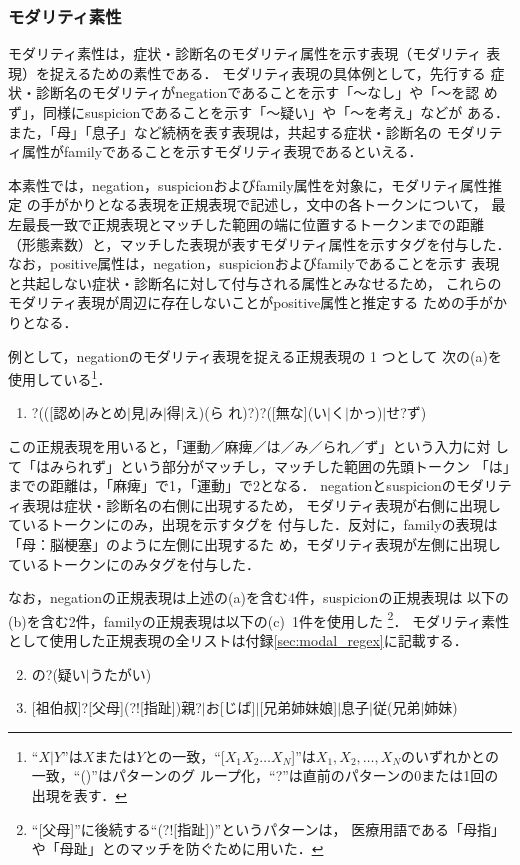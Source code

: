 \documentclass[japanese]{jnlp_1.4}
\begin{document}
\subsubsection*{モダリティ素性}

モダリティ素性は，症状・診断名のモダリティ属性を示す表現（モダリティ
表現）を捉えるための素性である．
モダリティ表現の具体例として，先行する
症状・診断名のモダリティがnegationであることを示す「〜なし」や「〜を認
めず」，同様にsuspicionであることを示す「〜疑い」や「〜を考え」などが
ある．また，「母」「息子」など続柄を表す表現は，共起する症状・診断名の
モダリティ属性がfamilyであることを示すモダリティ表現であるといえる．

本素性では，negation，suspicionおよびfamily属性を対象に，モダリティ属性推定
の手がかりとなる表現を正規表現で記述し，文中の各トークンについて，
最左最長一致で正規表現とマッチした範囲の端に位置するトークンまでの距離
（形態素数）と，マッチした表現が表すモダリティ属性を示すタグを付与した．
なお，positive属性は，negation，suspicionおよびfamilyであることを示す
表現と共起しない症状・診断名に対して付与される属性とみなせるため，
これらのモダリティ表現が周辺に存在しないことがpositive属性と推定する
ための手がかりとなる．

例として，negationのモダリティ表現を捉える正規表現の 1 つとして
次の(a)を
使用している\footnote{``$X|Y$''は$X$または$Y$との一致，``[$X_1 X_2 \dots
  X_N$]''は$X_1,X_2,\dots,X_N$のいずれかとの一致，``()''はパターンのグ
  ループ化，``?''は直前のパターンの0または1回の出現を表す．}．
\renewcommand{\labelenumi}{}
\begin{enumerate}
 \item \![はがを]?(([認め$|$みとめ$|$見$|$み$|$得$|$え)(ら
  れ)?)?([無な](い$|$く$|$かっ)$|$せ?ず)
\end{enumerate}
この正規表現を用いると，「運動／麻痺／は／み／られ／ず」という入力に対
して「はみられず」という部分がマッチし，マッチした範囲の先頭トークン
「は」までの距離は，「麻痺」で1，「運動」で2となる．
negationとsuspicionのモダリティ表現は症状・診断名の右側に出現するため，
モダリティ表現が右側に出現しているトークンにのみ，出現を示すタグを
付与した．反対に，familyの表現は「母：脳梗塞」のように左側に出現するた
め，モダリティ表現が左側に出現しているトークンにのみタグを付与した．

なお，negationの正規表現は上述の(a)を含む4件，suspicionの正規表現は
以下の(b)を含む2件，familyの正規表現は以下の(c)~1件を使用した
\footnote{``[父母]''に後続する``(?![指趾])''というパターンは，
医療用語である「母指」や「母趾」とのマッチを防ぐために用いた．}．
モダリティ素性として使用した正規表現の全リストは付録\ref{sec:modal_regex}に記載する．
\begin{enumerate}
\setcounter{enumi}{1}
 \item の?(疑い$|$うたがい)
 \item {[祖伯叔]?[父母](?![指趾])親?$|$お[じば]$|$[兄弟姉妹娘]$|$息子$|$従(兄弟$|$姉妹)}
\end{enumerate}
\renewcommand{\labelenumi}{}
\end{document}
